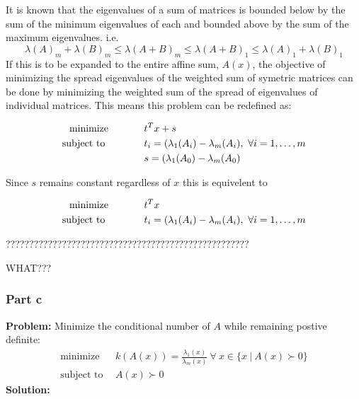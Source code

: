 \documentclass[letter]{article}
\newcommand{\optpblm}[3][eq:default]{
	\begin{equation}\label{#1}
		\begin{aligned}
			\text{minimize} \hspace{0.5in} &#2\vspace{5pt}\\
			\text{subject to \hspace{0.5in}} &#3
		\end{aligned}	
	\end{equation}
}
\begin{document}
It is known that the eigenvalues of a sum of matrices is bounded below by the sum of the minimum eigenvalues of each and bounded above by the sum of the maximum eigenvalues.
\cite{eigvalueBound}
i.e.
$$ \lambda(A)_m + \lambda(B)_m \leq \lambda(A+B)_m \leq \lambda(A+B)_1 \leq \lambda(A)_1 + \lambda(B)_1$$
If this is to be expanded to the entire affine sum, $A(x)$, the objective of minimizing the spread eigenvalues of the weighted sum of symetric matrices can be done by minimizing the weighted sum of the spread of eigenvalues of individual matrices.
This means this problem can be redefined as:
\optpblm{t^T x + s}{
	t_i = (\lambda_1(A_i) - \lambda_m(A_i), \ \forall i = 1,\dots,m\\
	&s = (\lambda_1(A_0) - \lambda_m(A_0)}
Since $s$ remains constant regardless of $x$ this is equivelent to
\optpblm{t^T x}{
	t_i = (\lambda_1(A_i) - \lambda_m(A_i), \ \forall i = 1,\dots,m}


????????????????????????????????????????????????????





WHAT???



\subsubsection{Part c}
\textbf{Problem:}
Minimize the conditional number of $A$ while remaining postive definite:
\begin{equation*}
	\begin{aligned}
		\text{minimize} \ \ &k(A(x)) = \frac{\lambda_1(x)}{\lambda_m(x)} \ \forall \ x \in \{x \ | \ A(x) \succ 0\}\\
		 \text{subject to} \ \ &A(x) \succ 0
	\end{aligned}
\end{equation*}
\textbf{Solution:}














\newpage
\end{document}
